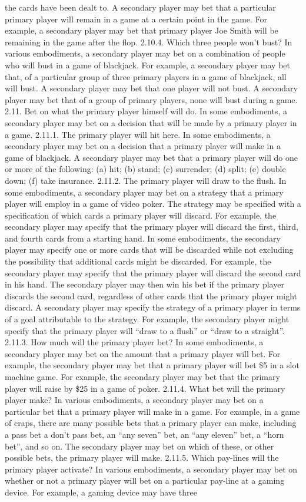 \documentclass[11pt,a4paper]{article}
\begin{document}
the cards have been dealt to. A secondary player may bet that a particular primary player will remain in a game at a certain point in the game. For example, a secondary player may bet that primary player Joe Smith will be remaining in the game after the flop. 2.10.4. Which three people won't bust? In various embodiments, a secondary player may bet on a combination of people who will bust in a game of blackjack. For example, a secondary player may bet that, of a particular group of three primary players in a game of blackjack, all will bust. A secondary player may bet that one player will not bust. A secondary player may bet that of a group of primary players, none will bust during a game. 2.11. Bet on what the primary player himself will do. In some embodiments, a secondary player may bet on a decision that will be made by a primary player in a game. 2.11.1. The primary player will hit here. In some embodiments, a secondary player may bet on a decision that a primary player will make in a game of blackjack. A secondary player may bet that a primary player will do one or more of the following: (a) hit; (b) stand; (c) surrender; (d) split; (e) double down; (f) take insurance. 2.11.2. The primary player will draw to the flush. In some embodiments, a secondary player may bet on a strategy that a primary player will employ in a game of video poker. The strategy may be specified with a specification of which cards a primary player will discard. For example, the secondary player may specify that the primary player will discard the first, third, and fourth cards from a starting hand. In some embodiments, the secondary player may specify one or more cards that will be discarded while not excluding the possibility that additional cards might be discarded. For example, the secondary player may specify that the primary player will discard the second card in his hand. The secondary player may then win his bet if the primary player discards the second card, regardless of other cards that the primary player might discard. A secondary player may specify the strategy of a primary player in terms of a goal attributable to the strategy. For example, the secondary player might specify that the primary player will “draw to a flush” or “draw to a straight”. 2.11.3. How much will the primary player bet? In some embodiments, a secondary player may bet on the amount that a primary player will bet. For example, the secondary player may bet that a primary player will bet \$5 in a slot machine game. For example, the secondary player may bet that the primary player will raise by \$25 in a game of poker. 2.11.4. What bet will the primary player make? In various embodiments, a secondary player may bet on a particular bet that a primary player will make in a game. For example, in a game of craps, there are many possible bets that a primary player can make, including a pass bet a don't pass bet, an “any seven” bet, an “any eleven” bet, a “horn bet”, and so on. The secondary player may bet on which of these, or other possible bets, the primary player will make. 2.11.5. Which pay-lines will the primary player activate? In various embodiments, a secondary player may bet on whether or not a primary player will bet on a particular pay-line at a gaming device. For example, a gaming device may have three 
\end{document}
